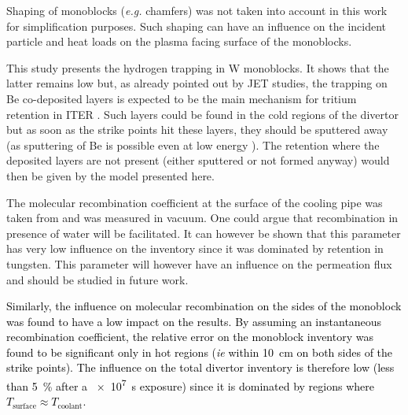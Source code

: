 Shaping of monoblocks (\textit{e.g.} chamfers) was not taken into account in this work for simplification purposes.
Such shaping can have an influence on the incident particle and heat loads on the plasma facing surface of the monoblocks.



This study presents the hydrogen trapping in W monoblocks.
It shows that the latter remains low but, as already pointed out by JET studies, the trapping on Be co-deposited layers is expected to be the main mechanism for tritium retention in ITER .
Such layers could be found in the cold regions of the divertor but as soon as the strike points hit these layers, they should be sputtered away (as sputtering of Be is possible even at low energy ).
The retention where the deposited layers are not present (either sputtered or not formed anyway) would then be given by the model presented here.

The molecular recombination coefficient at the surface of the cooling pipe was taken from  and was measured in vacuum.
One could argue that recombination in presence of water will be facilitated.
It can however be shown that this parameter has very low influence on the inventory since it was dominated by retention in tungsten.
This parameter will however have an influence on the permeation flux and should be studied in future work.

\textcolor{black}{Similarly, the influence on molecular recombination on the sides of the monoblock was found to have a low impact on the results.
By assuming an instantaneous recombination coefficient, the relative error on the monoblock inventory was found to be significant only in hot regions (\textit{ie} within \SI{10}{cm} on both sides of the strike points).
The influence on the total divertor inventory is therefore low (less than \SI{5}{\%} after a \SI{e7}{s} exposure) since it is dominated by regions where $T_\mathrm{surface} \approx T_\mathrm{coolant}$.}

